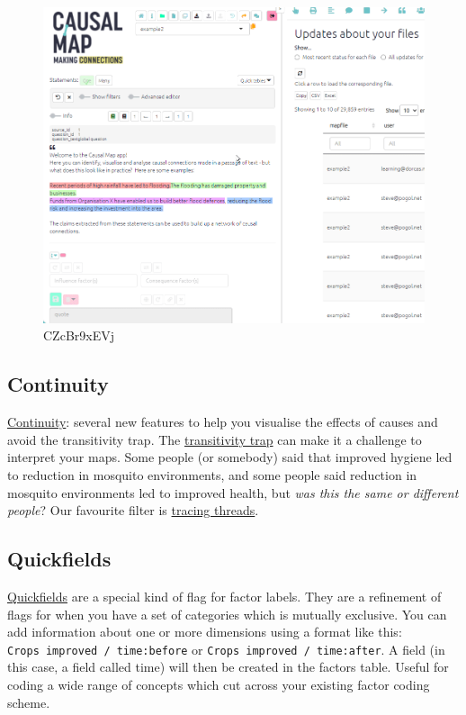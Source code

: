\documentclass[
]{book}
\begin{document}
\begin{figure}
\centering
\includegraphics{_assets/CZcBr9xEVj.gif}
\caption{CZcBr9xEVj}
\end{figure}

\hypertarget{continuity}{%
\subsection{Continuity}\label{continuity}}

\protect\hyperlink{xcontinuity}{Continuity}: several new features to help you visualise the effects of causes and avoid the transitivity trap. The \protect\hyperlink{xtransitivity-trap}{transitivity trap} can make it a challenge to interpret your maps. Some people (or somebody) said that improved hygiene led to reduction in mosquito environments, and some people said reduction in mosquito environments led to improved health, but \emph{was this the same or different people}? Our favourite filter is \protect\hyperlink{xtracing-threads}{tracing threads}.

\hypertarget{quickfields-1}{%
\subsection{Quickfields}\label{quickfields-1}}

\protect\hyperlink{xquickfields}{Quickfields} are a special kind of flag for factor labels. They are a refinement of flags for when you have a set of categories which is mutually exclusive. You can add information about one or more dimensions using a format like this: \texttt{Crops\ improved\ /\ time:before} or \texttt{Crops\ improved\ /\ time:after}. A field (in this case, a field called time) will then be created in the factors table. Useful for coding a wide range of concepts which cut across your existing factor coding scheme.
\end{document}
